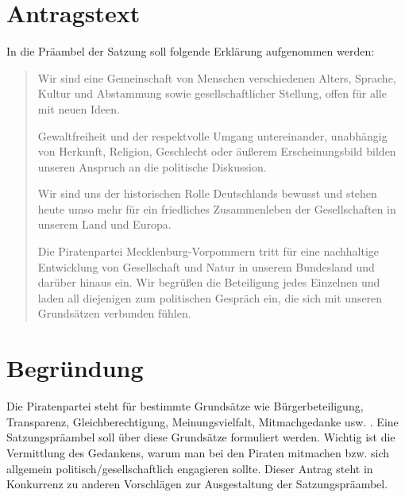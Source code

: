 \section{Antragstext}

In die Präambel der Satzung soll folgende Erklärung aufgenommen werden:

\begin{quote}

Wir sind eine Gemeinschaft von Menschen verschiedenen Alters, Sprache, Kultur und Abstammung sowie gesellschaftlicher Stellung, offen für alle mit neuen Ideen.

Gewaltfreiheit und der respektvolle Umgang untereinander, unabhängig von Herkunft, Religion, Geschlecht oder äußerem Erscheinungsbild bilden unseren Anspruch an die politische Diskussion.

Wir sind uns der historischen Rolle Deutschlands bewusst und stehen heute umso mehr für ein friedliches Zusammenleben der Gesellschaften in unserem Land und Europa.

Die Piratenpartei Mecklenburg-Vorpommern tritt für eine nachhaltige Entwicklung von Gesellschaft und Natur in unserem Bundesland und darüber hinaus ein. Wir begrüßen die Beteiligung jedes Einzelnen und laden all diejenigen zum politischen Gespräch ein, die sich mit unseren Grundsätzen verbunden fühlen.

\end{quote}
\section{Begründung}

Die Piratenpartei steht für bestimmte Grundsätze wie Bürgerbeteiligung, Transparenz, Gleichberechtigung, Meinungsvielfalt, Mitmachgedanke usw. . Eine Satzungspräambel soll über diese Grundsätze formuliert werden. Wichtig ist die Vermittlung des Gedankens, warum man bei den Piraten mitmachen bzw. sich allgemein politisch/gesellschaftlich engagieren sollte. Dieser Antrag steht in Konkurrenz zu anderen Vorschlägen zur Ausgestaltung der Satzungspräambel.
